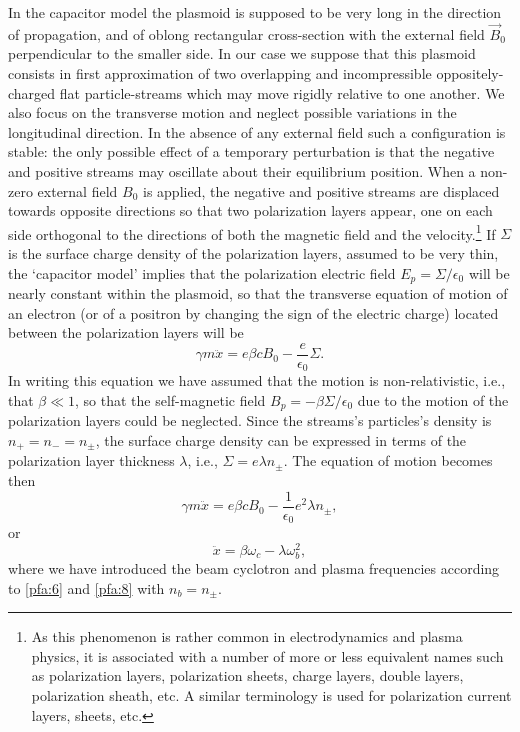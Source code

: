 \documentclass [12pt,a4paper,     ]{report} %
\begin{document}
   In the capacitor model the plasmoid is supposed to be very long in the direction of propagation, and of oblong rectangular cross-section with the external field $\vec{B}_0$ perpendicular to the smaller side.  In our case we suppose that this plasmoid consists in first approximation of two overlapping and incompressible oppositely-charged flat particle-streams which may move rigidly relative to one another.  We also focus on the transverse motion and neglect possible variations in the longitudinal direction.  In the absence of any external field such a configuration is stable: the only possible effect of a temporary perturbation is that the negative and positive streams may oscillate about their equilibrium position.  When a non-zero external field $B_0$ is applied, the negative and positive streams are displaced towards opposite directions so that two polarization layers appear, one on each side  orthogonal to the directions of both the magnetic field and the velocity.\footnote{As this phenomenon is rather common in electrodynamics and plasma physics, it is associated with a number of more or less equivalent names such as polarization layers, polarization sheets, charge layers, double layers, polarization sheath, etc.  A similar terminology is used for polarization current layers, sheets, etc.}  If $\Sigma$ is the surface charge density of the polarization layers, assumed to be very thin, the `capacitor model' implies that the polarization electric field $E_p=\Sigma/\epsilon_0$ will be nearly constant within the plasmoid, so that the transverse equation of motion of an electron (or of a positron by changing the sign of the electric charge) located between the polarization layers will be
%
\begin{equation}\label{pmv:1} 
    \gamma m \ddot x = e \beta c B_0 - \frac{e}{\epsilon_0} \Sigma.
\end{equation}
%
In writing this equation we have assumed that the motion is non-relativistic, i.e., that $\beta \ll 1$, so that the self-magnetic field $B_p=-\beta \Sigma/\epsilon_0$ due to the motion of the polarization layers could be neglected. Since the streams's particles's density is $n_{+} = n_{-} = n_\pm$, the surface charge density can be expressed in terms of the polarization layer thickness $\lambda$, i.e., $\Sigma = e \lambda n_\pm$.  The equation of motion becomes then
%
\begin{equation}\label{pmv:2} 
     \gamma m \ddot x = e \beta c B_0 - \frac{1}{\epsilon_0} e^2 \lambda n_\pm,
\end{equation}
%
or
%
\begin{equation}\label{pmv:3} 
         \ddot x = \beta \omega_c - \lambda \omega_b^2,
\end{equation}
%
where we have introduced the beam cyclotron and plasma frequencies according to \eqref{pfa:6} and \eqref{pfa:8} with $n_b=n_\pm$.
\end{document}

